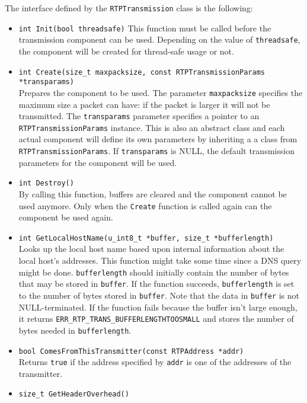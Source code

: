 \documentclass[12pt,a4paper]{article}
\begin{document}
				The interface defined by the {\tt RTPTransmission} class is the
				following:
				\begin{itemize}
					\item {\tt int Init(bool threadsafe)}
						This function must be called before the transmission component
						can be used. Depending on the value of {\tt threadsafe}, the
						component will be created for thread-safe usage or not.
					\item {\tt int Create(size\_t maxpacksize, const RTPTransmissionParams *transparams)}\\
						Prepares the component to be used. The parameter {\tt maxpacksize}
						specifies the maximum size a packet can have: if the packet
						is larger it will not be transmitted. The {\tt transparams}
						parameter specifies a pointer to an {\tt RTPTransmissionParams}
						instance. This is also an abstract class and each actual
						component will define its own parameters by inheriting a
						a class from {\tt RTPTransmissionParams}. If {\tt transparams}
						is NULL, the default transmission parameters for the component
						will be used.
					\item {\tt int Destroy()}\\
						By calling this function, buffers are cleared and the component
						cannot be used anymore. Only when the {\tt Create} function is
						called again can the component be used again.
					\item {\tt int GetLocalHostName(u\_int8\_t *buffer, size\_t *bufferlength)}\\
						Looks up the local host name based upon internal information about
						the local host's addresses. This function might take some time
						since a DNS query might be done. {\tt bufferlength} should initially
						contain the number of bytes that may be stored in {\tt buffer}.
						If the function succeeds, {\tt bufferlength} is set to the 
						number of bytes stored in {\tt buffer}. Note that the data in
						{\tt buffer} is not NULL-terminated. If the function fails because
						the buffer isn't large enough, it returns {\tt ERR\_RTP\_TRANS\_BUFFERLENGTHTOOSMALL}
						and stores the number of bytes needed in {\tt bufferlength}.
					\item {\tt bool ComesFromThisTransmitter(const RTPAddress *addr)}\\
						Returns {\tt true} if the address specified by {\tt addr} is one
						of the addresses of the transmitter. 
					\item {\tt size\_t GetHeaderOverhead()}\\

\end{itemize}
\end{document}
